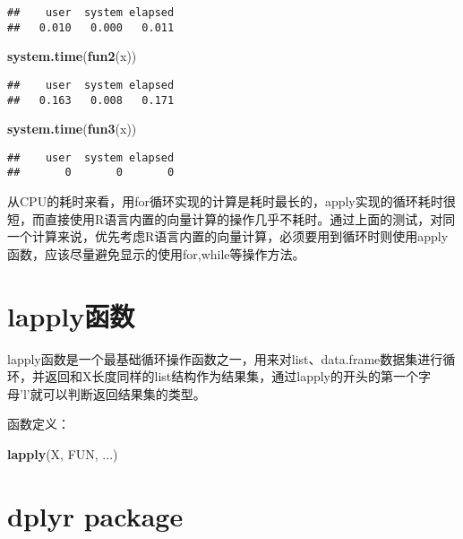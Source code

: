\documentclass[]{book}
\newenvironment{Shaded}{\begin{snugshade}}{\end{snugshade}}
\newcommand{\KeywordTok}[1]{\textcolor[rgb]{0.13,0.29,0.53}{\textbf{#1}}}
\newcommand{\NormalTok}[1]{#1}
\begin{document}
\begin{verbatim}
##    user  system elapsed 
##   0.010   0.000   0.011
\end{verbatim}

\begin{Shaded}
\begin{Highlighting}[]
\KeywordTok{system.time}\NormalTok{(}\KeywordTok{fun2}\NormalTok{(x))}
\end{Highlighting}
\end{Shaded}

\begin{verbatim}
##    user  system elapsed 
##   0.163   0.008   0.171
\end{verbatim}

\begin{Shaded}
\begin{Highlighting}[]
\KeywordTok{system.time}\NormalTok{(}\KeywordTok{fun3}\NormalTok{(x))}
\end{Highlighting}
\end{Shaded}

\begin{verbatim}
##    user  system elapsed 
##       0       0       0
\end{verbatim}

从CPU的耗时来看，用for循环实现的计算是耗时最长的，apply实现的循环耗时很短，而直接使用R语言内置的向量计算的操作几乎不耗时。通过上面的测试，对同一个计算来说，优先考虑R语言内置的向量计算，必须要用到循环时则使用apply函数，应该尽量避免显示的使用for,while等操作方法。

\hypertarget{lapply}{%
\section{lapply函数}\label{lapply}}

lapply函数是一个最基础循环操作函数之一，用来对list、data.frame数据集进行循环，并返回和X长度同样的list结构作为结果集，通过lapply的开头的第一个字母'l'就可以判断返回结果集的类型。

函数定义：

\begin{Shaded}
\begin{Highlighting}[]
\KeywordTok{lapply}\NormalTok{(X, FUN, ...)}
\end{Highlighting}
\end{Shaded}

\hypertarget{dplyr-package}{%
\section{dplyr package}\label{dplyr-package}}
\end{document}
